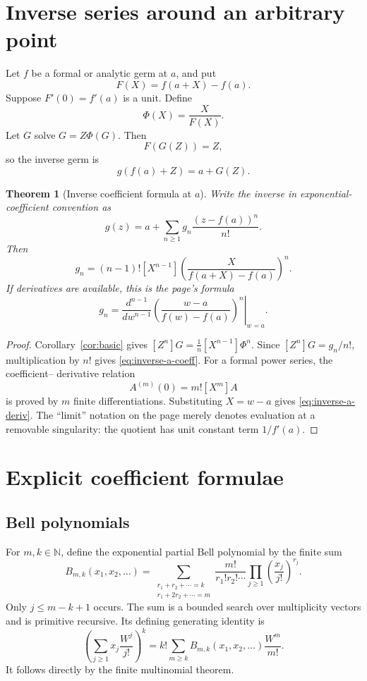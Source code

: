 \documentclass[11pt]{article}
\newtheorem{theorem}{Theorem}[section]
\theoremstyle{definition}
\newcommand{\N}{\mathbb N}
\begin{document}
\section{Inverse series around an arbitrary point}\label{sec:inverse}

Let \(f\) be a formal or analytic germ at \(a\), and put
\[
 F(X)=f(a+X)-f(a).
\]
Suppose \(F'(0)=f'(a)\) is a unit.  Define
\[
 \Phi(X)=\frac{X}{F(X)}.
\]
Let \(G\) solve \(G=Z\Phi(G)\).  Then
\[
 F(G(Z))=Z,
\]
so the inverse germ is
\[
 g(f(a)+Z)=a+G(Z).
\]

\begin{theorem}[Inverse coefficient formula at \(a\)]\label{thm:inverse-around-a}
Write the inverse in exponential-coefficient convention as
\[
 g(z)=a+\sum_{n\ge1}g_n\frac{(z-f(a))^n}{n!}.
\]
Then
\begin{equation}\label{eq:inverse-a-coeff}
 g_n=(n-1)![X^{n-1}]
 \left(\frac{X}{f(a+X)-f(a)}\right)^n.
\end{equation}
If derivatives are available, this is the page's formula
\begin{equation}\label{eq:inverse-a-deriv}
 g_n=\left.
 \frac{d^{n-1}}{dw^{n-1}}
 \left(\frac{w-a}{f(w)-f(a)}\right)^n
 \right|_{w=a}.
\end{equation}
\end{theorem}
\begin{proof}
Corollary~\ref{cor:basic} gives
\([Z^n]G=\frac1n[X^{n-1}]\Phi^n\).  Since
\([Z^n]G=g_n/n!\), multiplication by \(n!\) gives
\eqref{eq:inverse-a-coeff}.  For a formal power series, the coefficient--
derivative relation
\[
 A^{(m)}(0)=m![X^m]A
\]
is proved by \(m\) finite differentiations.  Substituting \(X=w-a\) gives
\eqref{eq:inverse-a-deriv}.  The ``limit'' notation on the page merely denotes
evaluation at a removable singularity: the quotient has unit constant term
\(1/f'(a)\).
\end{proof}

\section{Explicit coefficient formulae}\label{sec:explicit}

\subsection{Bell polynomials}

For \(m,k\in\N\), define the exponential partial Bell polynomial by the finite
sum
\begin{equation}\label{eq:bell-def}
 B_{m,k}(x_1,x_2,\ldots)
 =\sum_{\substack{r_1+r_2+\cdots=k\\
                   r_1+2r_2+\cdots=m}}
 \frac{m!}{r_1!r_2!\cdots}
 \prod_{j\ge1}\left(\frac{x_j}{j!}\right)^{r_j}.
\end{equation}
Only \(j\le m-k+1\) occurs.  The sum is a bounded search over multiplicity
vectors and is primitive recursive.  Its defining generating identity is
\begin{equation}\label{eq:bell-power}
 \left(\sum_{j\ge1}x_j\frac{W^j}{j!}\right)^k
 =k!\sum_{m\ge k}B_{m,k}(x_1,x_2,\ldots)\frac{W^m}{m!}.
\end{equation}
It follows directly by the finite multinomial theorem.
\end{document}
